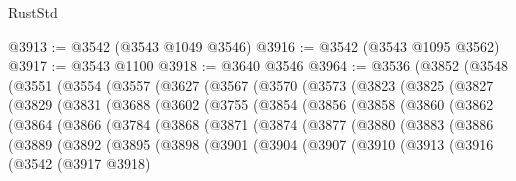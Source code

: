\begin{lexlean}{RustStd}
\begin{coremodule}
{\begin{coremodule}
{{{{{{{{{{{{{{{{{{{{{{{{{{{{{{{{{{{{{{{{{{{{{{{{{{@3913 := @3542 (@3543 @1049 @3546)
@3916 := @3542 (@3543 @1095 @3562)
@3917 := @3543 @1100
@3918 := @3640 @3546
@3964 := @3536
    (@3852
      (@3548
        (@3551
          (@3554
            (@3557
              (@3627
                (@3567
                  (@3570
                    (@3573
                      (@3823
                        (@3825
                          (@3827
                            (@3829
                              (@3831
                                (@3688
                                  (@3602
                                    (@3755
                                      (@3854
                                        (@3856
                                          (@3858
                                            (@3860
                                              (@3862
                                                (@3864
                                                  (@3866
                                                    (@3784
                                                      (@3868
                                                        (@3871
                                                          (@3874
                                                            (@3877
                                                              (@3880
                                                                (@3883
                                                                  (@3886
                                                                    (@3889
                                                                      (@3892
                                                                        (@3895
                                                                          (@3898
                                                                            (@3901
                                                                              (@3904
                                                                                (@3907
                                                                                  (@3910
                                                                                    (@3913
                                                                                      (@3916
                                                                                        (@3542
                                                                                          (@3917
                                                                                            @3918)
}}}}}}}}}}}}}}}}}}}}}}}}}}}}}}}}}}}}}}}}}}}}}}}}}}
\end{coremodule}}
\end{coremodule}
\end{lexlean}

